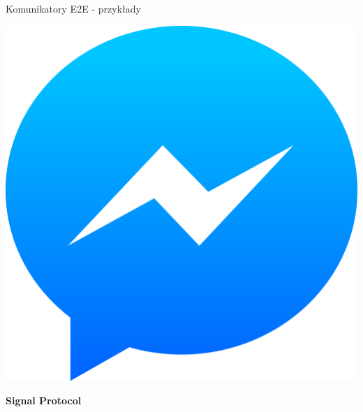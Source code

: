 \begin{frame}{Komunikatory E2E - przykłady}
\begin{center}
        \begin{minipage}{0.1\textwidth}
            \includegraphics[width=\textwidth]{applications/graphics/Messenger.png}
        \end{minipage}
        \begin{minipage}{0.6\textwidth}
            \textbf{Signal Protocol}
        \end{minipage}

        \vspace{0.3cm}


\end{center}
\end{frame}
